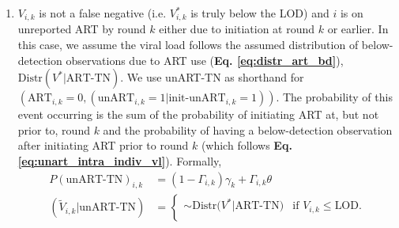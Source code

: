 \documentclass{article}[11pt]
\begin{document}
\begin{enumerate}
\begin{align}
(\tilde{V}_{i,k}|\text{noART-TN}) &= \begin{cases} 
    \sim 10^{\text{Normal}_{\infty}^\text{LOD}(\mu=\mu_i, \sigma=\sigma_i)} & \text{if } V_{i,k} \leq \text{LOD}. \\
\end{cases}
\end{align}
\item $V_{i,k}$ is not a false negative (i.e. $V^*_{i,k}$ is truly below the LOD) and $i$ is on unreported ART by round $k$ either due to initiation at round $k$ or earlier. In this case, we assume the viral load follows the assumed distribution of below-detection observations due to ART use (\textbf{Eq. \ref{eq:distr_art_bd}}), $\text{Distr}(V^*|\text{ART-TN})$. We use unART-TN as shorthand for $(\text{ART}_{i,k}=0,(\text{unART}_{i,k}=1 |\text{init-unART}_{i,k}=1))$. The probability of this event occurring is the sum of the probability of initiating ART at, but not prior to, round $k$ and the probability of having a below-detection observation after initiating ART prior to round $k$ (which follows \textbf{Eq. \ref{eq:unart_intra_indiv_vl}}). Formally,
\begin{align}
P(\text{unART-TN})_{i,k} &= (1-\Gamma_{i,k})\gamma_k + \Gamma_{i,k}\theta \\
(\tilde{V}_{i,k}|\text{unART-TN}) &= \begin{cases} 
    \sim \text{Distr}(V^*|\text{ART-TN)} & \text{if } V_{i,k} \leq \text{LOD}. \\
\end{cases}
\end{align}
\end{enumerate}
\end{document}
